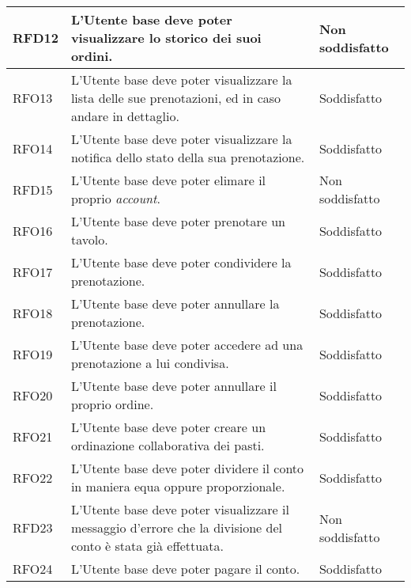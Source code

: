 \begin{longtable}{|l|p{}|p{3cm}|}
	\hline
	RFD12       & L'Utente base deve poter visualizzare lo storico dei suoi ordini.                                                       & Non soddisfatto \\
	\hline
	RFO13       & L'Utente base deve poter visualizzare la lista delle sue prenotazioni, ed in caso andare in dettaglio.                  & Soddisfatto \\
	\hline
	RFO14       & L'Utente base deve poter visualizzare la notifica dello stato della sua prenotazione.                                   & Soddisfatto \\
	\hline
	RFD15       & L'Utente base deve poter elimare il proprio \textit{account}.                                                           & Non soddisfatto \\
	\hline
	RFO16       & L'Utente base deve poter prenotare un tavolo.                                                                           & Soddisfatto \\
	\hline
	RFO17       & L'Utente base deve poter condividere la prenotazione.                                                                   & Soddisfatto \\
	\hline
	RFO18       & L'Utente base deve poter annullare la prenotazione.                                                                     & Soddisfatto \\
	\hline
	RFO19       & L'Utente base deve poter accedere ad una prenotazione a lui condivisa.                            					  & Soddisfatto \\
	\hline
	RFO20       & L'Utente base deve poter annullare il proprio ordine.                                                                   & Soddisfatto \\
	\hline
	RFO21       & L'Utente base deve poter creare un ordinazione collaborativa dei pasti.                                                 & Soddisfatto \\
	\hline
	RFO22       & L'Utente base deve poter dividere il conto in maniera equa oppure proporzionale.                               		& Soddisfatto                                                  \\
	\hline
	RFD23       & L'Utente base deve poter visualizzare il messaggio d'errore che la divisione del conto è stata già effettuata. 		& Non soddisfatto                                       \\
	\hline
	RFO24       & L'Utente base deve poter pagare il conto.                                                                      		& Soddisfatto                                                                             \\

\end{longtable}
